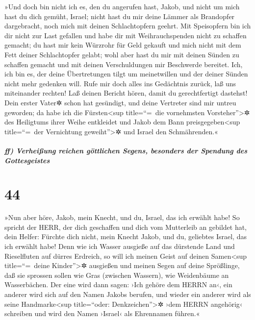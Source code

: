 »Und doch bin nicht ich es, den du angerufen hast, Jakob,
und nicht um mich hast du dich gemüht, Israel; nicht hast
du mir deine Lämmer als Brandopfer dargebracht, noch mich mit deinen
Schlachtopfern geehrt. Mit Speisopfern bin ich dir nicht zur Last
gefallen und habe dir mit Weihrauchspenden nicht zu schaffen gemacht;
du hast mir kein Würzrohr für Geld gekauft und mich nicht
mit dem Fett deiner Schlachtopfer gelabt; wohl aber hast du mir mit
deinen Sünden zu schaffen gemacht und mit deinen Verschuldungen mir
Beschwerde bereitet. Ich, ich bin es, der deine
Übertretungen tilgt um meinetwillen und der deiner Sünden nicht mehr
gedenken will. Rufe mir doch alles ins Gedächtnis zurück,
laß uns miteinander rechten! Laß deinen Bericht hören, damit du
gerechtfertigt dastehst! Dein erster Vater✲ schon hat
gesündigt, und deine Vertreter sind mir untreu geworden;
da habe ich die Fürsten\textless sup title=``=~die
vornehmsten Vorsteher''\textgreater✲ des Heiligtums ihrer Weihe
entkleidet und Jakob dem Bann preisgegeben\textless sup title=``=~der
Vernichtung geweiht''\textgreater✲ und Israel den Schmährenden.«

\hypertarget{ff-verheiuxdfung-reichen-guxf6ttlichen-segens-besonders-der-spendung-des-gottesgeistes}{%
\subparagraph{ff) Verheißung reichen göttlichen Segens, besonders der
Spendung des
Gottesgeistes}\label{ff-verheiuxdfung-reichen-guxf6ttlichen-segens-besonders-der-spendung-des-gottesgeistes}}

\hypertarget{section-43}{%
\section{44}\label{section-43}}

»Nun aber höre, Jakob, mein Knecht, und du, Israel, das
ich erwählt habe! So spricht der HERR, der dich geschaffen
und dich vom Mutterleib an gebildet hat, dein Helfer: Fürchte dich
nicht, mein Knecht Jakob, und du, geliebtes Israel, das ich erwählt
habe! Denn wie ich Wasser ausgieße auf das dürstende Land
und Rieselfluten auf dürres Erdreich, so will ich meinen Geist auf
deinen Samen\textless sup title=``=~deine Kinder''\textgreater✲
ausgießen und meinen Segen auf deine Sprößlinge, daß sie
sprossen sollen wie Gras (zwischen Wassern), wie Weidenbäume an
Wasserbächen. Der eine wird dann sagen: ›Ich gehöre dem
HERRN an‹, ein anderer wird sich auf den Namen Jakobs berufen, und
wieder ein anderer wird als seine Handmarke\textless sup title=``oder:
Denkzeichen''\textgreater✲ ›dem HERRN angehörig‹ schreiben und wird den
Namen ›Israel‹ als Ehrennamen führen.«

